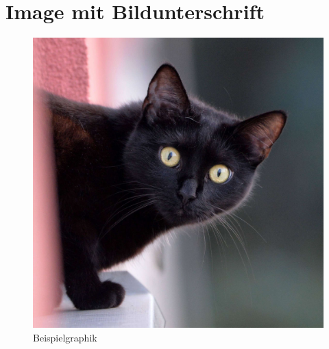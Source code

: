 \documentclass{scrarticle}
\begin{document}
	\section{Image mit Bildunterschrift}
	\begin{figure}[h!hbt]
		\includegraphics[width=\linewidth]{./Abbildungen/Beispiel.jpg}
		\caption{Beispielgraphik}
	\end{figure}
	\newpage
	
\end{document}
